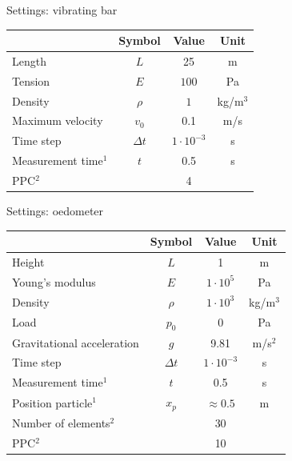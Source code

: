 \documentclass[mathserif,professionalfont]{beamer}
\begin{document}


\appendix
\begin{frame}{Settings: vibrating bar}
\begin{table}[h]
\centering
\begin{tabular}{l | c c c}
 & Symbol & Value & Unit \\
\hline
Length& $L$ & 25 & m\\
Tension& $E$ & $ 100$ & Pa\\
Density & $\rho$ & $1$ & kg/m$^3$\\
Maximum velocity & $v_0$ & 0.1 & m/s\\
Time step & $\Delta t$ &$ 1 \cdot10^{-3}$ & s\\
Measurement time$^1$ & $t$ & 0.5 & s\\
PPC$^2$ & & 4 & \\
\end{tabular}
\end{table}



\end{frame}

\begin{frame}{Settings: oedometer}
\begin{table}[h]
\centering
\begin{tabular}{l | c c c}
 & Symbol & Value & Unit \\
\hline
Height & $L$ & 1 & m\\
Young's modulus& $E$ & $ 1 \cdot10^5$ & Pa\\
Density & $\rho$ & $1 \cdot10^3$ & kg/m$^3$\\
Load & $p_0$ & $0$ & Pa\\
Gravitational acceleration & $g$ & 9.81 & m/s$^2$\\ 
Time step & $\Delta t$ &$ 1 \cdot10^{-3}$ & s\\
Measurement time$^1$ & $t$ & 0.5 & s\\
Position particle$^1$ & $x_p$ & $\approx 0.5$ & m\\
Number of elements$^2$ & & 30& \\
PPC$^2$ & & 10 & \\
\end{tabular}
\end{table}
\end{frame}
\end{document}
